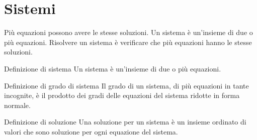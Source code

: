 \section{Sistemi}
\label{sec:Sistemi}
Più  equazioni  possono avere le stesse soluzioni. Un sistema è un'insieme di due o più equazioni. Risolvere un sistema è verificare che più equazioni hanno le stesse soluzioni.
\begin{definizionet}{Definizione di sistema}{}
Un sistema è un'insieme di due o più  equazioni.
\end{definizionet}
\begin{definizionet}{Definizione di grado di sistema}{}\label{def:sistemaGrado}
Il grado di un sistema, di più equazioni in tante incognite,  è il prodotto dei gradi delle equazioni del sistema ridotte in forma normale.
\end{definizionet}
\begin{definizionet}{Definizione di soluzione}{}
Una soluzione per un sistema è un insieme ordinato di valori che sono soluzione per ogni equazione del sistema.
\end{definizionet}
